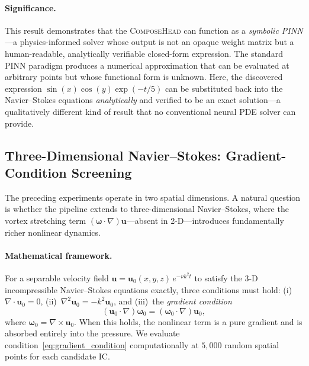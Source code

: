 \paragraph{Significance.}
This result demonstrates that the \textsc{ComposeHead} can function as a
\emph{symbolic PINN}---a physics-informed solver whose output is not an opaque
weight matrix but a human-readable, analytically verifiable closed-form
expression.  The standard PINN paradigm produces a numerical approximation
that can be evaluated at arbitrary points but whose functional form is
unknown.  Here, the discovered expression $\sin(x)\cos(y)\exp(-t/5)$ can be
substituted back into the Navier--Stokes equations \emph{analytically} and
verified to be an exact solution---a qualitatively different kind of result
that no conventional neural PDE solver can provide.

\subsection{Three-Dimensional Navier--Stokes: Gradient-Condition Screening}
\label{sec:3d_ns}

The preceding experiments operate in two spatial dimensions.  A natural
question is whether the pipeline extends to three-dimensional
Navier--Stokes, where the vortex stretching term
$(\boldsymbol{\omega}\!\cdot\!\nabla)\mathbf{u}$---absent in 2-D---introduces
fundamentally richer nonlinear dynamics.

\paragraph{Mathematical framework.}
For a separable velocity field
$\mathbf{u} = \mathbf{u}_0(x,y,z)\,e^{-\nu k^2 t}$ to satisfy the 3-D
incompressible Navier--Stokes equations exactly, three conditions must hold:
(i)~$\nabla\!\cdot\!\mathbf{u}_0 = 0$,
(ii)~$\nabla^2\mathbf{u}_0 = -k^2\mathbf{u}_0$, and
(iii)~the \emph{gradient condition}
\begin{equation}
  (\mathbf{u}_0\!\cdot\!\nabla)\boldsymbol{\omega}_0
  = (\boldsymbol{\omega}_0\!\cdot\!\nabla)\mathbf{u}_0,
  \label{eq:gradient_condition}
\end{equation}
where $\boldsymbol{\omega}_0 = \nabla\!\times\!\mathbf{u}_0$.  When this
holds, the nonlinear term is a pure gradient and is absorbed entirely into
the pressure.  We evaluate condition~\eqref{eq:gradient_condition}
computationally at $5{,}000$ random spatial points for each candidate IC\@.

